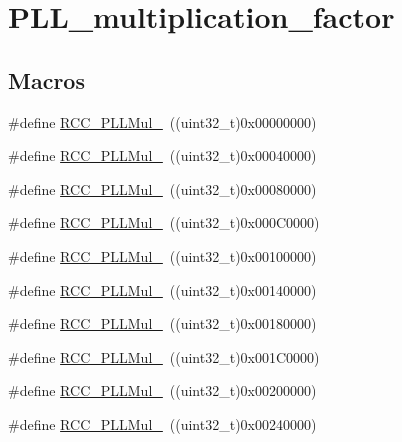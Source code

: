 \hypertarget{group___p_l_l__multiplication__factor}{}\section{P\+L\+L\+\_\+multiplication\+\_\+factor}
\label{group___p_l_l__multiplication__factor}
\subsection*{Macros}
\begin{DoxyCompactItemize}
\item 
\#define \mbox{\hyperlink{group___p_l_l__multiplication__factor_ga91b3b28fa4d56693d1eb361e24f317af}{R\+C\+C\+\_\+\+P\+L\+L\+Mul\+\_}}~((uint32\+\_\+t)0x00000000)
\item 
\#define \mbox{\hyperlink{group___p_l_l__multiplication__factor_gafc2dd6c503b9ee6e0cfbec6d7d3a3e00}{R\+C\+C\+\_\+\+P\+L\+L\+Mul\+\_}}~((uint32\+\_\+t)0x00040000)
\item 
\#define \mbox{\hyperlink{group___p_l_l__multiplication__factor_ga897be2cbbdabb6035bfe9bd515d6897f}{R\+C\+C\+\_\+\+P\+L\+L\+Mul\+\_}}~((uint32\+\_\+t)0x00080000)
\item 
\#define \mbox{\hyperlink{group___p_l_l__multiplication__factor_gad45e4f8edbbf4d49ded913e83e3a2d06}{R\+C\+C\+\_\+\+P\+L\+L\+Mul\+\_}}~((uint32\+\_\+t)0x000\+C0000)
\item 
\#define \mbox{\hyperlink{group___p_l_l__multiplication__factor_ga2eea74b9955e556b302f4d446dd68eb4}{R\+C\+C\+\_\+\+P\+L\+L\+Mul\+\_}}~((uint32\+\_\+t)0x00100000)
\item 
\#define \mbox{\hyperlink{group___p_l_l__multiplication__factor_ga1c307e520d53fa21bc60efcb71c03e01}{R\+C\+C\+\_\+\+P\+L\+L\+Mul\+\_}}~((uint32\+\_\+t)0x00140000)
\item 
\#define \mbox{\hyperlink{group___p_l_l__multiplication__factor_ga8c1f1c5fe591f062078acf603bfbfb06}{R\+C\+C\+\_\+\+P\+L\+L\+Mul\+\_}}~((uint32\+\_\+t)0x00180000)
\item 
\#define \mbox{\hyperlink{group___p_l_l__multiplication__factor_ga984bc5a117e3c6066e2fc7b29a0affda}{R\+C\+C\+\_\+\+P\+L\+L\+Mul\+\_}}~((uint32\+\_\+t)0x001\+C0000)
\item 
\#define \mbox{\hyperlink{group___p_l_l__multiplication__factor_ga572881d8c1e6c5b635198b286a2f4087}{R\+C\+C\+\_\+\+P\+L\+L\+Mul\+\_}}~((uint32\+\_\+t)0x00200000)
\item 
\#define \mbox{\hyperlink{group___p_l_l__multiplication__factor_ga15da9e109b8556e96bdb9543347366c9}{R\+C\+C\+\_\+\+P\+L\+L\+Mul\+\_}}~((uint32\+\_\+t)0x00240000)

\end{DoxyCompactItemize}
